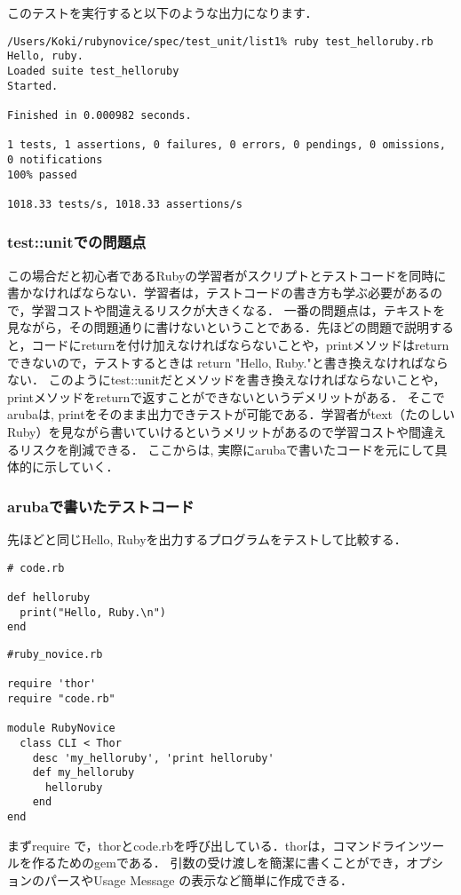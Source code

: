 このテストを実行すると以下のような出力になります．
\begin{lstlisting}[style=customRuby,basicstyle={\scriptsize\ttfamily}]
/Users/Koki/rubynovice/spec/test_unit/list1% ruby test_helloruby.rb 
Hello, ruby.
Loaded suite test_helloruby
Started.

Finished in 0.000982 seconds.

1 tests, 1 assertions, 0 failures, 0 errors, 0 pendings, 0 omissions, 0 notifications
100% passed

1018.33 tests/s, 1018.33 assertions/s
\end{lstlisting}
\subsubsection{test::unitでの問題点}

この場合だと初心者であるRubyの学習者がスクリプトとテストコードを同時に書かなければならない．学習者は，テストコードの書き方も学ぶ必要があるので，学習コストや間違えるリスクが大きくなる．
一番の問題点は，テキストを見ながら，その問題通りに書けないということである．先ほどの問題で説明すると，コードにreturnを付け加えなければならないことや，printメソッドはreturnできないので，テストするときは return "Hello, Ruby."と書き換えなければならない．
このようにtest::unitだとメソッドを書き換えなければならないことや，printメソッドをreturnで返すことができないというデメリットがある．
そこでarubaは, printをそのまま出力できテストが可能である．学習者がtext（たのしいRuby）を見ながら書いていけるというメリットがあるので学習コストや間違えるリスクを削減できる．
ここからは, 実際にarubaで書いたコードを元にして具体的に示していく．

\subsubsection{arubaで書いたテストコード}
先ほどと同じHello, Rubyを出力するプログラムをテストして比較する．
\begin{lstlisting}[style=customRuby,basicstyle={\scriptsize\ttfamily}]
# code.rb

def helloruby    
  print("Hello, Ruby.\n")
end
\end{lstlisting}\begin{lstlisting}[style=customRuby,basicstyle={\scriptsize\ttfamily}]
#ruby_novice.rb

require 'thor'                                                                         
require "code.rb"

module RubyNovice
  class CLI < Thor
    desc 'my_helloruby', 'print helloruby'
    def my_helloruby
      helloruby
    end
end
\end{lstlisting}
まずrequire で，thorとcode.rbを呼び出している．thorは，コマンドラインツールを作るためのgemである．
引数の受け渡しを簡潔に書くことができ，オプションのパースやUsage Message の表示など簡単に作成できる．

